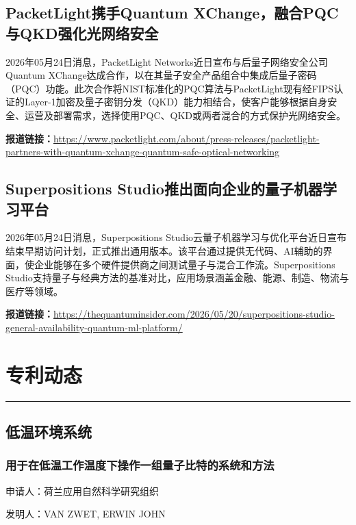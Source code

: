 \documentclass[12pt,a4paper]{ctexart}
\begin{document}
\subsection{ PacketLight携手Quantum XChange，融合PQC与QKD强化光网络安全 }

2026年05月24日消息，PacketLight Networks近日宣布与后量子网络安全公司Quantum XChange达成合作，以在其量子安全产品组合中集成后量子密码（PQC）功能。此次合作将NIST标准化的PQC算法与PacketLight现有经FIPS认证的Layer-1加密及量子密钥分发（QKD）能力相结合，使客户能够根据自身安全、运营及部署需求，选择使用PQC、QKD或两者混合的方式保护光网络安全。

\noindent\textbf{报道链接：}\url{https://www.packetlight.com/about/press-releases/packetlight-partners-with-quantum-xchange-quantum-safe-optical-networking }

\subsection{ Superpositions Studio推出面向企业的量子机器学习平台 }

2026年05月24日消息，Superpositions Studio云量子机器学习与优化平台近日宣布结束早期访问计划，正式推出通用版本。该平台通过提供无代码、AI辅助的界面，使企业能够在多个硬件提供商之间测试量子与混合工作流。Superpositions Studio支持量子与经典方法的基准对比，应用场景涵盖金融、能源、制造、物流与医疗等领域。

\noindent\textbf{报道链接：}\url{https://thequantuminsider.com/2026/05/20/superpositions-studio-general-availability-quantum-ml-platform/ }

\newpage
\section{专利动态}
\vspace{-0.5em}
\noindent\rule{\linewidth}{1.5pt}

\subsection{ 低温环境系统 }

\subsubsection{ 用于在低温工作温度下操作一组量子比特的系统和方法 }

申请人：荷兰应用自然科学研究组织

发明人：VAN ZWET, ERWIN JOHN
\end{document}
